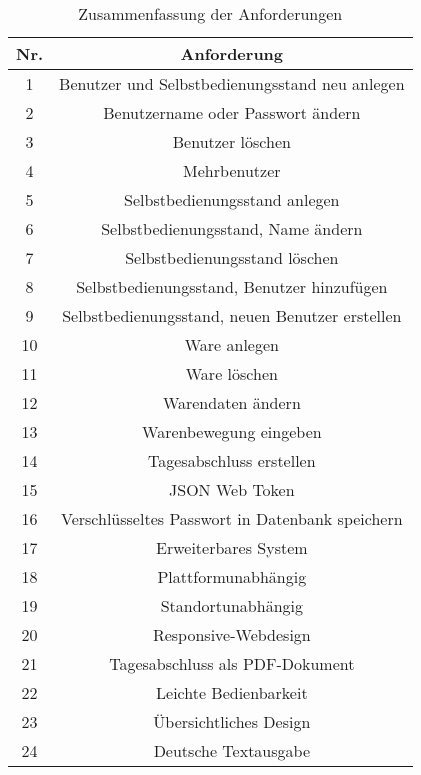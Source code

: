 \begin{table}[htbp]
	\centering
\begin{tabular}{|c|c|}
		\hline
	Nr. & Anforderung \\
	\hline
	1 & Benutzer und Selbstbedienungsstand neu anlegen \\
	\hline
	2 & Benutzername oder Passwort ändern \\
	\hline
	3 & Benutzer löschen \\
	\hline
	4 & Mehrbenutzer \\
\hline	
	5 & Selbstbedienungsstand anlegen \\
	\hline
	6 & Selbstbedienungsstand, Name ändern \\
	\hline
	7 & Selbstbedienungsstand löschen \\
	\hline
	8 & Selbstbedienungsstand, Benutzer hinzufügen \\
	\hline
	9 & Selbstbedienungsstand, neuen Benutzer erstellen \\
	\hline
	10 & Ware anlegen \\
	\hline
	11 &  Ware löschen\\
	\hline
	12 &  Warendaten ändern\\
	\hline
	13 & Warenbewegung eingeben \\
	\hline
	14 & Tagesabschluss erstellen \\
	\hline
	15 & JSON Web Token  \\
	\hline
	16 &  Verschlüsseltes Passwort in Datenbank speichern\\
	\hline
	17 & Erweiterbares System \\
	\hline
	18 &  Plattformunabhängig\\
	\hline
	19 &  Standortunabhängig\\
	\hline
	20 & Responsive-Webdesign \\
	\hline
	21 &  Tagesabschluss als PDF-Dokument\\
	\hline
	22 & Leichte Bedienbarkeit \\
	\hline
	23 &  Übersichtliches Design\\
	\hline
	24 &  Deutsche Textausgabe\\
	\hline
\end{tabular}
	\caption{Zusammenfassung der Anforderungen}
\label{tab:zu}
\end{table}
